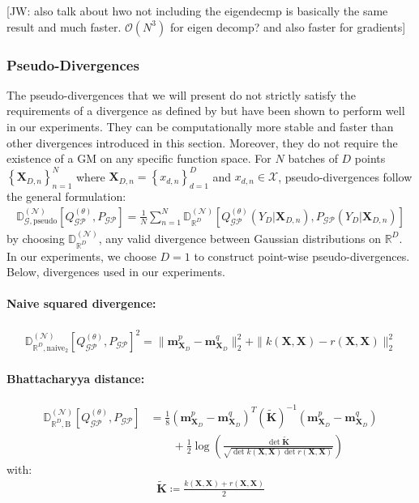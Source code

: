 \documentclass{article}
\newcommand{\jw}[1]{{\color{gray} [JW: #1]}}
\newcommand{\GP}{\operatorname{\mathcal{GP}}}
\numberwithin{equation}{section}
\begin{document}
\jw{also talk about hwo not including the eigendecmp is basically the same result and much faster. $\mathcal{O}(N^3)$ for eigen decomp? and also faster for gradients}

\subsubsection{Pseudo-Divergences}
The pseudo-divergences that we will present do not strictly satisfy the requirements of a divergence as defined by \cite{knoblauch2022optimization} but have been shown to perform well in our experiments. They can be computationally more stable and faster than other divergences introduced in this section. Moreover, they do not require the existence of a GM on any specific function space. For $N$ batches of $D$ points $\left\{\mathbf{X}_{D, n}\right\}_{n=1}^N$ where $\mathbf{X}_{D, n}=\left\{x_{d, n}\right\}_{d=1}^D$ and $x_{d, n} \in \mathcal{X}$, pseudo-divergences follow the general formulation:
\begin{align}
    \mathbb{D}_{\mathcal{G}, \text{pseudo}}^{(\mathcal{N})} \left[Q_{\GP}^{(\theta)}, P_{\GP}\right] = \frac{1}{N}\sum_{n=1}^N \mathbb{D}_{\mathbb{R}^D}^{(\mathcal{N})}\left[Q_{\GP}^{(\theta)}(Y_D\vert \mathbf{X}_{D, n}), P_{\GP}(Y_D\vert \mathbf{X}_{D, n})\right]
\end{align}
by choosing $\mathbb{D}_{\mathbb{R}^D}^{(\mathcal{N})}$,  any valid divergence between Gaussian distributions on $\mathbb{R}^D$. In our experiments, we choose $D=1$ to construct point-wise pseudo-divergences. Below, divergences used in our experiments.
\paragraph{Naive squared divergence:} 
\begin{align}
    \mathbb{D}_{\mathbb{R}^D, \text{naive}_2}^{(\mathcal{N})} \left[Q_{\GP}^{(\theta)}, P_{\GP}\right]^2 = \|\mathbf{m}_{\mathbf{X}_D}^p - \mathbf{m}_{\mathbf{X}_D}^q\|_2^2 + \|k(\mathbf{X}, \mathbf{X}) - r(\mathbf{X}, \mathbf{X})\|_2^2
\end{align}

\paragraph{Bhattacharyya distance:} 
\begin{align}
    \mathbb{D}_{\mathbb{R}^D, \text{B}}^{(\mathcal{N})} \left[Q_{\GP}^{(\theta)}, P_{\GP}\right] &= \frac{1}{8}\left(\mathbf{m}_{\mathbf{X}_D}^p - \mathbf{m}_{\mathbf{X}_D}^q\right)^T \left(\tilde{\textbf{K}}\right)^{-1}\left(\mathbf{m}_{\mathbf{X}_D}^p - \mathbf{m}_{\mathbf{X}_D}^q\right) \nonumber
    \\ &\qquad + \frac{1}{2} \log\left(\frac{\det\tilde{\textbf{K}}}{\sqrt{\det k(\mathbf{X}, \mathbf{X})\det r(\mathbf{X}, \mathbf{X})}}\right)
\end{align}
with:
\begin{align}
    \tilde{\textbf{K}} \coloneqq \frac{ k(\mathbf{X}, \mathbf{X}) +  r(\mathbf{X}, \mathbf{X})}{2}
\end{align}
\end{document}
